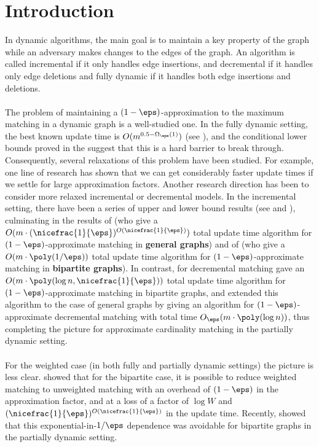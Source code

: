 \section{Introduction}

In dynamic algorithms, the main goal is to maintain a key property of the graph while an adversary makes changes to the edges of the graph. An algorithm is called incremental if it only handles edge insertions, and decremental if it handles only edge deletions and fully dynamic if it handles both edge insertions and deletions. \\ \\
The problem of maintaining a $(1-\eps)$-approximation to the maximum matching in a dynamic graph is a well-studied one. In the fully dynamic setting, the best known update time is $O(m^{0.5-\Omega_{\eps}(1)})$ (see \cite{BKS23}), and the conditional lower bounds proved in the \cite{HKNS15,KPP16} suggest that this is a hard barrier to break through. Consequently, several relaxations of this problem have been studied. For example, one line of research has shown that we can get considerably faster update times if we settle for large approximation factors. Another research direction has been to consider more relaxed incremental or decremental models. In the incremental setting, there have been a series of upper and lower bound results (see \cite{Dahlgaard16} and \cite{Gupta2014}), culminating in the results of \cite{GLSSS19} (who give a $O(m\cdot (\nicefrac{1}{\eps})^{O(\nicefrac{1}{\eps})})$ total update time algorithm for $(1-\eps)$-approximate matching in \textbf{general graphs}) and of \cite{BlikstadK23} (who give a $O(m\cdot \poly(1/\eps))$ total update time algorithm for $(1-\eps)$-approximate matching in \textbf{bipartite graphs}). In contrast, for decremental matching \cite{BPT20,JambulapatiJST22} gave an $O(m\cdot\poly(\log n,\nicefrac{1}{\eps}))$ total update time algorithm for $(1-\eps)$-approximate matching in bipartite graphs, and \cite{AssadiBD22} extended this algorithm to the case of general graphs by giving an algorithm for $(1-\eps)$-approximate decremental matching with total time $O_{\eps}(m\cdot \poly(\log n))$, thus completing the picture for approximate cardinality matching in the partially dynamic setting. \\ \\
For the weighted case (in both fully and partially dynamic settings) the picture is less clear. \cite{BernsteinDL21} showed that for the bipartite case, it is possible to reduce weighted matching to unweighted matching with an overhead of $(1-\eps)$ in the approximation factor, and at a loss of a factor of $\log W$ and $(\nicefrac{1}{\eps})^{O(\nicefrac{1}{\eps})}$ in the update time. Recently, \cite{BhattacharyaKS23b} showed that this exponential-in-$1/\eps$ dependence was avoidable for bipartite graphs in the partially dynamic setting. \\ \\
